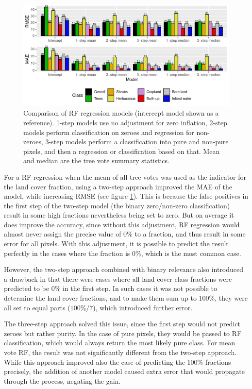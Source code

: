 \documentclass[review,authoryear,3p]{elsarticle}
\begin{document}
\begin{figure}
    \centering
    \includegraphics[width=\textwidth]{article/article-figures/barplots/2020-06-04-rf-comparison-bar}
    \caption{Comparison of \gls{RF} regression models (intercept model shown as a reference). 1-step models use no adjustment for zero inflation, 2-step models perform classification on zeroes and regression for non-zeroes, 3-step models perform a classification into pure and non-pure pixels, and then a regression or classification based on that. Mean and median are the tree vote summary statistics.}
    \label{fig-randomforest}
\end{figure}

For a \gls{RF} regression when the mean of all tree votes was used as the indicator for the land cover fraction, using a two-step approach improved the \gls{MAE} of the model, while increasing \gls{RMSE} (see figure \ref{fig-randomforest}).
This is because the false positives in the first step of the two-step model (the binary zero/non-zero classification) result in some high fractions nevertheless being set to zero.
But on average it does improve the accuracy, since without this adjustment, \gls{RF} regression would almost never assign the precise value of 0\% to a fraction, and thus result in some error for all pixels.
With this adjustment, it is possible to predict the result perfectly in the cases where the fraction is 0\%, which is the most common case.

However, the two-step approach combined with binary relevance also introduced a drawback in that there were cases where all land cover class fractions were predicted to be 0\% in the first step.
In such cases it was not possible to determine the land cover fractions, and to make them sum up to 100\%, they were all set to equal parts ($100\% / 7$), which introduced further error.

The three-step approach solved this issue, since the first step would not predict zeroes but rather purity.
In the case of pure pixels, they would be passed to \gls{RF} classification, which would always return the most likely pure class.
For mean vote \gls{RF}, the result was not significantly different from the two-step approach.
While this approach improved also the case of predicting the 100\% fractions precisely, the addition of another model caused extra error that would propagate through the process, negating the gain.
\end{document}

